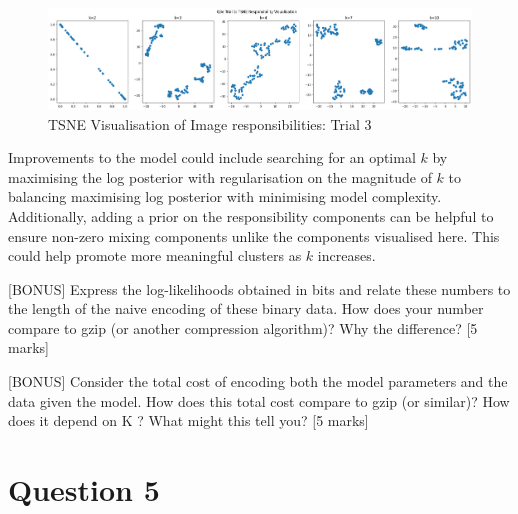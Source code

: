 \documentclass[12pt]{article}
\begin{document}
\begin{enumerate}
\begin{figure}[h]
  \centering
  \includegraphics[scale=0.35]{outputs/q3/q3e-3-tsne}
  \caption{TSNE Visualisation of Image responsibilities: Trial 3}
  \label{fig:3e-tsne-3}
\end{figure}

Improvements to the model could include searching for an optimal $k$ by maximising the log posterior with regularisation on the magnitude of $k$ to balancing maximising log posterior with minimising model complexity. Additionally, adding a prior on the responsibility components can be helpful to ensure non-zero mixing components unlike the components visualised here. This could help promote more meaningful clusters as $k$ increases.

\end{enumerate}

[BONUS] Express the log-likelihoods obtained in bits and relate these numbers to the length
of the naive encoding of these binary data. How does your number compare to gzip (or
another compression algorithm)? Why the difference? [5 marks]


 [BONUS] Consider the total cost of encoding both the model parameters and the data given
the model. How does this total cost compare to gzip (or similar)? How does it depend on
K ? What might this tell you? [5 marks]


\newpage
\section*{Question 5}
\end{document}

